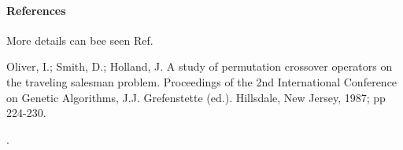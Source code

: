 \documentclass[letterpaper,10pt,english]{sphinxmanual}
\begin{document}
\begin{fulllineitems}
\paragraph{References}

More details can bee seen Ref. %
\begin{footnote}[1]\sphinxAtStartFootnote
Oliver, I.; Smith, D.; Holland, J. A study of permutation crossover
operators on the traveling salesman problem. Proceedings of the 2nd
International Conference on Genetic Algorithms, J.J. Grefenstette (ed.).
Hillsdale, New Jersey, 1987; pp 224-230.
%
\end{footnote}.

\end{fulllineitems}

\end{document}
